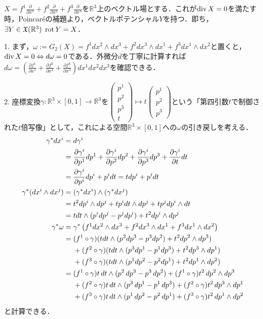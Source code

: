 \documentclass[uplatex, dvipdfmx]{jsreport}
\begin{document}
\begin{example}[ベクトルポテンシャルの求め方]
    $X=f^1\frac{\partial}{\partial x^1}+f^2\frac{\partial}{\partial x^2}+f^3\frac{\partial}{\partial x^3}$を$\mathbb{R}^3$上のベクトル場とする．これが$\operatorname{\mathrm{div}} X=0$を満たす時，Poincaréの補題より，ベクトルポテンシャル$Y$を持つ．即ち，$\exists Y\in\mathfrak{X}(\mathbb{R}^3)\;\operatorname{\mathrm{rot}} Y=X$．

    1. まず，$\omega:=G_2(X)=f^1dx^2\wedge dx^3+f^2dx^3\wedge dx^1+f^3dx^1\wedge dx^2$と置くと，$\operatorname{\mathrm{div}} X=0\Leftrightarrow d\omega=0$である．外微分$d$を丁寧に計算すれば$d\omega=\left( \frac{\partial f^1}{\partial x^1} + \frac{\partial f^2}{\partial x^2} + \frac{\partial f^3}{\partial x^3} \right)dx^1dx^2dx^3$を確認できる．

    2. 座標変換$\gamma:\mathbb{R}^3\times[0,1]\to\mathbb{R}^3$を$\begin{pmatrix}p^1\\p^2\\p^3\\t\end{pmatrix}\mapsto t\begin{pmatrix}p^1\\p^2\\p^3\end{pmatrix}$という「第四引数$t$で制御された$t$倍写像」として，これによる空間$\mathbb{R}^3\times[0,1]$への$\omega$の引き戻しを考える．
    \begin{align*}
        \gamma^*dx^i  &= d\gamma^i \\
        &= \frac{\partial\gamma^i}{\partial p^1}dp^1 + \frac{\partial\gamma^i}{\partial p^2}dp^2 + \frac{\partial\gamma^i}{\partial p^3}dp^3 + \frac{\partial\gamma^i}{\partial t}dt \\
        &= \frac{\partial\gamma^i}{\partial p^i}dp^i + p^idt = tdp^i +  p^idt\\
        \gamma^*(dx^i\wedge dx^j) &= (\gamma^*dx^i) \wedge (\gamma^*dx^j) \\
        &= t^2dp^i\wedge dp^j + tp^idt\wedge dp^j + tp^jdp^i\wedge dt\\
        &= tdt\wedge (p^idp^j-p^jdp^i) + t^2dp^i\wedge dp^j \\
        \gamma^*\omega &= \gamma^*\left( f^1dx^2\wedge dx^3+f^2dx^3\wedge dx^1+f^3dx^1\wedge dx^2 \right) \\
        &= (f^1\circ\gamma) (tdt\wedge (p^2dp^3-p^3dp^2) + t^2dp^2\wedge dp^3) \\*
        &\hphantom{{}={}}+ (f^2\circ\gamma) (tdt\wedge (p^3dp^1-p^1dp^3) + t^2dp^3\wedge dp^1) \\*
        &\hphantom{{}={}}+ (f^3\circ\gamma) (tdt\wedge (p^1dp^2-p^2dp^1) + t^2dp^1\wedge dp^2) \\
        &=(f^1\circ\gamma)t\,dt\wedge(p^2\,dp^3-p^3\,dp^2)+(f^1\circ\gamma)t^2\,dp^2\wedge dp^3\\*
        &\hphantom{{}={}}+(f^2\circ\gamma)t\,dt\wedge(p^3\,dp^1-p^1\,dp^3)+(f^2\circ\gamma)t^2\,dp^3\wedge dp^1\\*
        &\hphantom{{}={}}+(f^3\circ\gamma)t\,dt\wedge(p^1\,dp^2-p^2\,dp^1)+(f^3\circ\gamma)t^2\,dp^1\wedge dp^2
    \end{align*}
    と計算できる．


\end{example}
\end{document}
